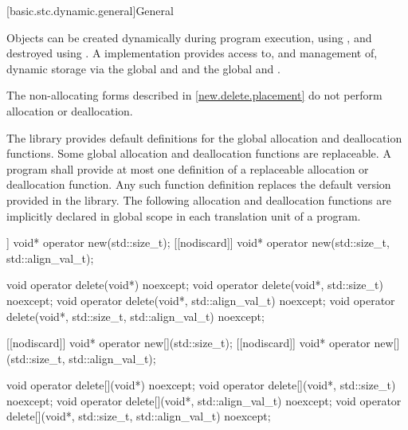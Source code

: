 [basic.stc.dynamic.general]{General}%

\pnum
Objects can be created dynamically during program
execution, using
%
, and destroyed using
%
. A \Cpp{} implementation
provides access to, and management of, dynamic storage via the global
  and  and the global   and .
\begin{note}
The non-allocating forms described in \ref{new.delete.placement}
do not perform allocation or deallocation.
\end{note}

\pnum
The library provides default definitions for the global allocation and
deallocation functions. Some global allocation and deallocation
functions are replaceable. A \Cpp{} program shall
provide at most one definition of a replaceable allocation or
deallocation function. Any such function definition replaces the default
version provided in the library. The
following allocation and deallocation functions
are implicitly declared in global scope in each translation unit of a
program.

\begin{codeblock}
[[nodiscard]] void* operator new(std::size_t);
[[nodiscard]] void* operator new(std::size_t, std::align_val_t);

void operator delete(void*) noexcept;
void operator delete(void*, std::size_t) noexcept;
void operator delete(void*, std::align_val_t) noexcept;
void operator delete(void*, std::size_t, std::align_val_t) noexcept;

[[nodiscard]] void* operator new[](std::size_t);
[[nodiscard]] void* operator new[](std::size_t, std::align_val_t);

void operator delete[](void*) noexcept;
void operator delete[](void*, std::size_t) noexcept;
void operator delete[](void*, std::align_val_t) noexcept;
void operator delete[](void*, std::size_t, std::align_val_t) noexcept;
\end{codeblock}

